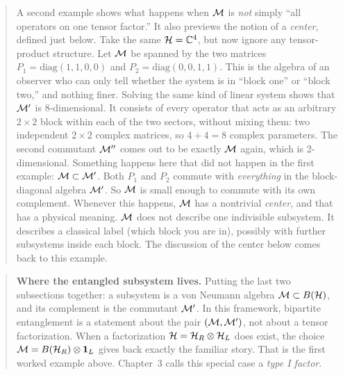 \begin{quote}
A second example shows what happens when $\mathcal{M}$ is \emph{not} simply ``all operators on one tensor factor.''
It also previews the notion of a \emph{center}, defined just below. Take the same $\mathcal{H}=\mathbb C^4$, but now
ignore any tensor-product structure. Let $\mathcal{M}$ be spanned by the two matrices $P_1=\mathrm{diag}(1,1,0,0)$ and
$P_2=\mathrm{diag}(0,0,1,1)$. This is the algebra of an observer who can only tell whether the system is in
``block one'' or ``block two,'' and nothing finer. Solving the same kind of linear system shows that $\mathcal{M}'$ is
8-dimensional. It consists of every operator that acts as an arbitrary $2\times2$ block within each of the
two sectors, without mixing them: two independent $2\times2$ complex matrices, so $4+4=8$ complex
parameters. The second commutant $\mathcal{M}''$ comes out to be exactly $\mathcal{M}$ again, which is 2-dimensional. Something
happens here that did not happen in the first example: $\mathcal{M}\subset\mathcal{M}'$. Both $P_1$ and $P_2$ commute with
\emph{everything} in the block-diagonal algebra $\mathcal{M}'$. So $\mathcal{M}$ is small enough to commute with its own
complement. Whenever this happens, $\mathcal{M}$ has a nontrivial \emph{center}, and that has a physical meaning. $\mathcal{M}$
does not describe one indivisible subsystem. It describes a classical label (which block you are in),
possibly with further subsystems inside each block. The discussion of the center below comes back to this
example.
\end{quote}

\begin{quote}
\textbf{Where the entangled subsystem lives.} Putting the last two subsections together: a subsystem is a von
Neumann algebra $\mathcal{M}\subset B(\mathcal{H})$, and its complement is the commutant $\mathcal{M}'$. In this framework, bipartite
entanglement is a statement about the pair $(\mathcal{M},\mathcal{M}')$, not about a tensor factorization. When a factorization
$\mathcal{H}=\mathcal{H}_R\otimes\mathcal{H}_L$ does exist, the choice $\mathcal{M}=B(\mathcal{H}_R)\otimes\mathbf{1}_L$ gives back exactly the familiar
story. That is the first worked example above. Chapter~3 calls this special case a \emph{type I factor}.
\end{quote}

